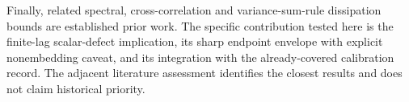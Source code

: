 Finally, related spectral, cross-correlation and variance-sum-rule
dissipation bounds are established prior work. The specific contribution
tested here is the finite-lag scalar-defect implication, its sharp endpoint
envelope with explicit nonembedding caveat, and its integration with the
already-covered calibration record. The adjacent literature assessment
identifies the closest results and does not claim historical priority.
